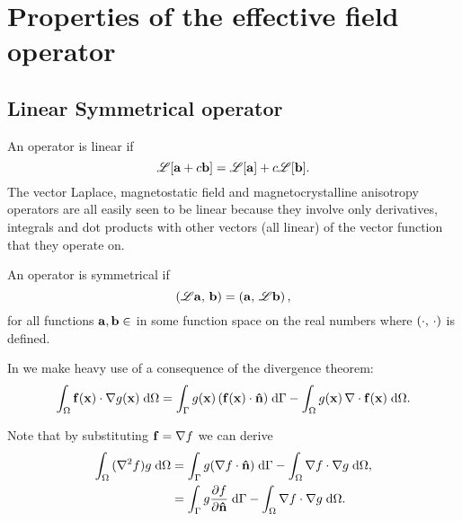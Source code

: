 \newtheorem{theorem}{Theorem}

\newcommand{\ff}{f}
\newcommand{\gf}{g}

\newcommand{\knl}{k}

\chapter{Properties of the effective field operator}
\label{sec:properties-of-field-operators}

\section{Linear Symmetrical operator}
\label{sec:linear-symm-field-operators}

An operator is linear if
\begin{equation}
  \mathscr{L}[{\boldsymbol{\mathrm{a}}} + c{\boldsymbol{\mathrm{b}}}] = \mathscr{L}[{\boldsymbol{\mathrm{a}}}] + c\mathscr{L}[{\boldsymbol{\mathrm{b}}}].
\end{equation}
The vector Laplace, magnetostatic field and magnetocrystalline anisotropy operators are all easily seen to be linear because they involve only derivatives, integrals and dot products with other vectors (all linear) of the vector function that they operate on.

An operator is symmetrical if
\begin{equation}
  \left(\mathscr{L} {\boldsymbol{\mathrm{a}}},\, {\boldsymbol{\mathrm{b}}} \right) = \left({\boldsymbol{\mathrm{a}}},\, \mathscr{L} {\boldsymbol{\mathrm{b}}} \right),
\end{equation}
for all functions ${\boldsymbol{\mathrm{a}}}, {\boldsymbol{\mathrm{b}}} \in $ in some function space on the real numbers where $\left(\cdot,\, \cdot \right)$ is defined.

In  we make heavy use of a consequence of the divergence theorem:
\begin{equation}
  \intd{\fv(\xv) \cdot \grad \gf(\xv)}
  = \intb{\gf(\xv) \, (\fv(\xv) \cdot \nv)} - \intd{\gf(\xv) \, \div \fv(\xv)}.
  \label{eqn:grad-divergence}
\end{equation}

Note that by substituting $\fv = \grad \ff$ we can derive
\begin{equation}
  \begin{aligned}
    \intd{(\lap \ff) \gf}
    &= \intb{\gf (\grad \ff \cdot \nv)} - \intd{\grad \ff \cdot \grad \gf}, \\
    &= \intb{\gf \ddn{\ff}} - \intd{\grad \ff \cdot \grad \gf}.
    \label{eqn:laplace-divergence}
  \end{aligned}
\end{equation}

